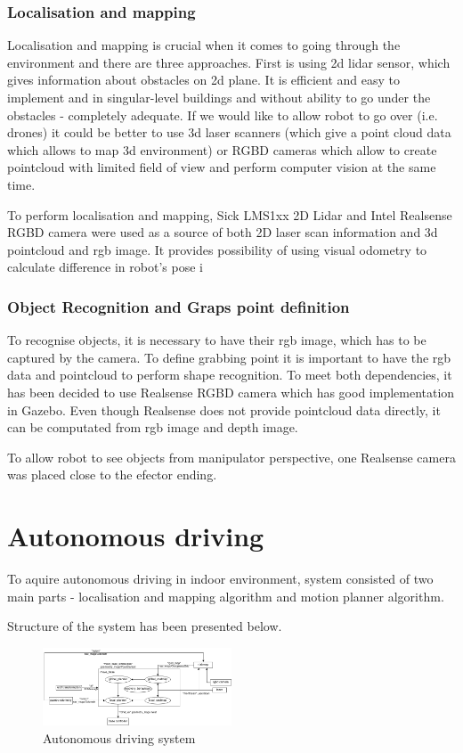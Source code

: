 \documentclass[conference,a4paper]{IEEEtran}
\begin{document}
\subsubsection{Localisation and mapping}
Localisation and mapping is crucial when it comes to going through the environment and there are three approaches. First is using 2d lidar sensor, which gives information about obstacles on 2d plane. It is efficient and easy to implement and in  singular-level buildings and without 
ability to go under the obstacles - completely adequate. If we would like to allow robot to go over (i.e. drones) it could be better to use 3d laser scanners (which give a point cloud data which allows to map 3d environment) or RGBD cameras which allow to create 
pointcloud with limited field of view and perform computer vision at the same time.

To perform localisation and mapping, Sick LMS1xx 2D Lidar and Intel Realsense RGBD camera were used as a source of both 2D laser scan information and 3d pointcloud and rgb image. It provides possibility of using visual odometry to calculate difference in robot's pose i


\subsubsection{Object Recognition and Graps point definition}
To recognise objects, it is necessary to have their rgb image, which has to be captured by the camera. 
To define grabbing point it is important to have the rgb data and pointcloud to perform shape recognition. To meet both dependencies, it has been decided to use Realsense RGBD camera which has good implementation in Gazebo. Even though Realsense does not provide pointcloud data directly, it can be 
computated from rgb image and depth image.

To allow robot to see objects from manipulator perspective, one Realsense camera was placed close to the efector ending.

\section{Autonomous driving}
To aquire autonomous driving in indoor environment, system consisted of two main parts - localisation and mapping algorithm and motion planner algorithm.

Structure of the system has been presented below.

\begin{figure}[ht]
  \includegraphics[width=0.5\textwidth]{img/navigation_scheme.png}
  \caption[navigation structure]{Autonomous driving system}
\end{figure}
\end{document}
